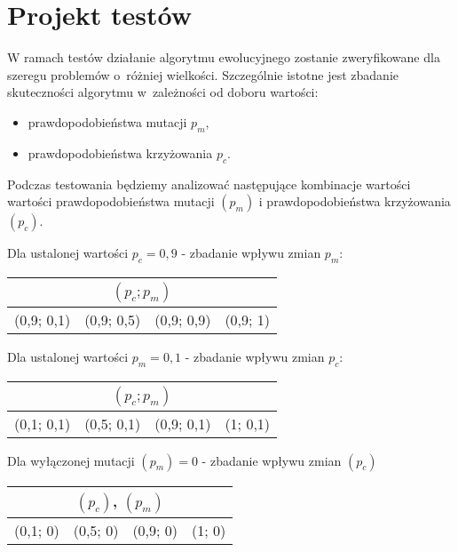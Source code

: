 \documentclass[12pt, a4paper]{article}
\begin{document}
\section{Projekt testów}
W ramach testów działanie algorytmu ewolucyjnego zostanie zweryfikowane dla szeregu problemów o~różniej wielkości. Szczególnie istotne jest zbadanie skuteczności algorytmu w~zależności od doboru wartości:
\begin{itemize}
	\item prawdopodobieństwa mutacji $p_m$,
	\item prawdopodobieństwa krzyżowania $p_c$.
\end{itemize}

Podczas testowania będziemy analizować następujące kombinacje wartości wartości prawdopodobieństwa mutacji $(p_m)$ i prawdopodobieństwa krzyżowania $(p_c)$.

\bigskip

Dla ustalonej wartości $p_c = 0,9$ - zbadanie wpływu zmian $p_m$:
\begin{center}
\begin{tabular}{|l|l|l|l|}
\hline
\multicolumn{4}{|c|}{$(p_c; p_m)$} \\
\hline
(0,9; 0,1) & (0,9; 0,5) & (0,9; 0,9) & (0,9; 1)\\
\hline
\end{tabular}
\end{center}

\bigskip

Dla ustalonej wartości $p_m = 0,1$ - zbadanie wpływu zmian $p_c$:
\begin{center}
\begin{tabular}{|l|l|l|l|}
\hline
\multicolumn{4}{|c|}{$(p_c; p_m)$} \\
\hline
(0,1; 0,1) & (0,5; 0,1) & (0,9; 0,1) & (1; 0,1)\\
\hline
\end{tabular}
\end{center}

\bigskip

Dla wyłączonej mutacji $(p_m) = 0$ - zbadanie wpływu zmian $(p_c)$
\begin{center}
\begin{tabular}{|l|l|l|l|}
\hline
\multicolumn{4}{|c|}{$(p_c)$, $(p_m)$} \\
\hline
(0,1; 0) & (0,5; 0) & (0,9; 0) & (1; 0)\\
\hline
\end{tabular}
\end{center}
\end{document}
